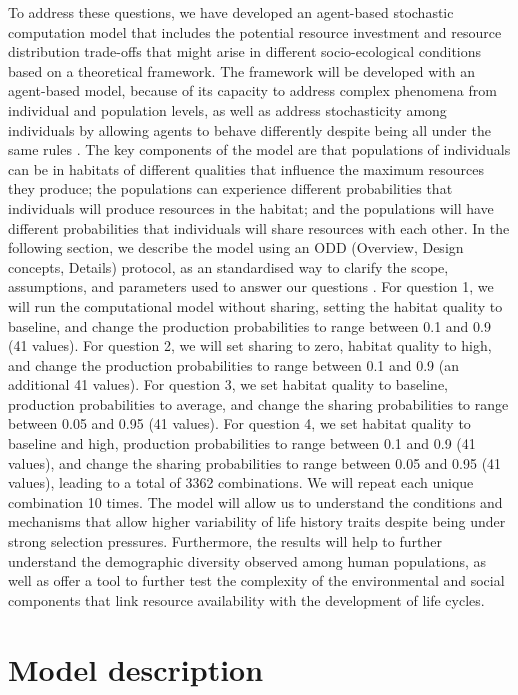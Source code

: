 \documentclass{article}
\begin{document}
To address these questions, we have developed an agent-based stochastic computation model that includes the potential resource investment and resource distribution trade-offs that might arise in different socio-ecological conditions based on a theoretical framework. The framework will be developed with an agent-based model, because of its capacity to address complex phenomena from individual and population levels, as well as address stochasticity among individuals by allowing agents to behave differently despite being all under the same rules \citep{judson1994rise,wilensky2015introduction}. The key components of the model are that populations of individuals can be in habitats of different qualities that influence the maximum resources they produce; the populations can experience different probabilities that individuals will produce resources in the habitat; and the populations will have different probabilities that individuals will share resources with each other. In the following section, we describe the model using an ODD (Overview, Design concepts, Details) protocol, as an standardised way to clarify the scope, assumptions, and parameters used to answer our questions \citep{grimm2006standard,grimm2020odd}. For question 1, we will run the computational model without sharing, setting the habitat quality to baseline, and change the production probabilities to range between 0.1 and 0.9 (41 values). For question 2, we will set sharing to zero, habitat quality to high, and change the production probabilities to range between 0.1 and 0.9 (an additional 41 values). For question 3, we set habitat quality to baseline, production probabilities to average, and change the sharing probabilities to range between 0.05 and 0.95 (41 values). For question 4, we set habitat quality to baseline and high, production probabilities to range between 0.1 and 0.9 (41 values), and change the sharing probabilities to range between 0.05 and 0.95 (41 values), leading to a total of 3362 combinations. We will repeat each unique combination 10 times. The model will allow us to understand the conditions and mechanisms that allow higher variability of life history traits despite being under strong selection pressures. Furthermore, the results will help to further understand the demographic diversity observed among human populations, as well as offer a tool to further test the complexity of the environmental and social components that link resource availability with the development of life cycles.



\section{Model description}
\end{document}
